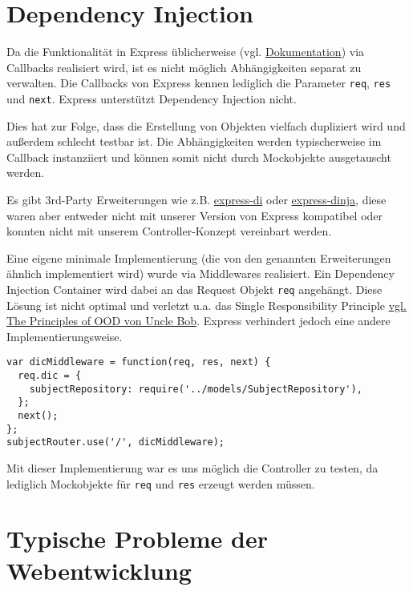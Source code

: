 \section{Dependency Injection}\label{dependency-injection}

Da die Funktionalität in Express üblicherweise (vgl.
\href{http://expressjs.com/en/starter/basic-routing.html}{Dokumentation})
via Callbacks realisiert wird, ist es nicht möglich Abhängigkeiten
separat zu verwalten. Die Callbacks von Express kennen lediglich die
Parameter \texttt{req}, \texttt{res} und \texttt{next}. Express
unterstützt Dependency Injection nicht.

Dies hat zur Folge, dass die Erstellung von Objekten vielfach dupliziert
wird und außerdem schlecht testbar ist. Die Abhängigkeiten werden
typischerweise im Callback instanziiert und können somit nicht durch
Mockobjekte ausgetauscht werden.

Es gibt 3rd-Party Erweiterungen wie z.B.
\href{https://github.com/luin/express-di}{express-di} oder
\href{https://github.com/floatdrop/express-dinja}{express-dinja}, diese
waren aber entweder nicht mit unserer Version von Express kompatibel
oder konnten nicht mit unserem Controller-Konzept vereinbart werden.

Eine eigene minimale Implementierung (die von den genannten
Erweiterungen ähnlich implementiert wird) wurde via Middlewares
realisiert. Ein Dependency Injection Container wird dabei an das Request
Objekt \texttt{req} angehängt. Diese Lösung ist nicht optimal und
verletzt u.a. das Single Responsibility Principle
\href{http://www.butunclebob.com/ArticleS.UncleBob.PrinciplesOfOod}{vgl.
The Principles of OOD von Uncle Bob}. Express verhindert jedoch eine
andere Implementierungsweise.

\begin{verbatim}
var dicMiddleware = function(req, res, next) {
  req.dic = {
    subjectRepository: require('../models/SubjectRepository'),
  };
  next();
};
subjectRouter.use('/', dicMiddleware);
\end{verbatim}

Mit dieser Implementierung war es uns möglich die Controller zu testen,
da lediglich Mockobjekte für \texttt{req} und \texttt{res} erzeugt
werden müssen.

\section{Typische Probleme der
Webentwicklung}\label{typische-probleme-der-webentwicklung}

